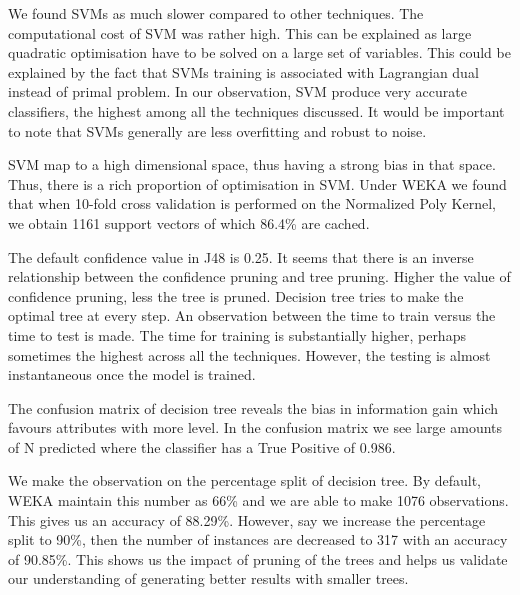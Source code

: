  We found SVMs as much slower compared to other techniques. The computational cost of SVM was rather high. This can be explained as large quadratic optimisation have to be solved on a large set of variables. This could be explained by the fact that SVMs training is associated with Lagrangian dual instead of primal problem. In our observation, SVM produce very accurate classifiers, the highest among all the techniques discussed. It would be important to note that SVMs generally are less overfitting and robust to noise.

SVM map to a high dimensional space, thus having a strong bias in that space. Thus, there is a rich proportion of optimisation in SVM. Under WEKA we found that when 10-fold cross validation is performed on the Normalized Poly Kernel, we obtain 1161 support vectors of which 86.4\% are cached. 

The default confidence value in J48 is 0.25. It seems that there is an inverse relationship between the confidence pruning and tree pruning. Higher the value of confidence pruning, less the tree is pruned. 
Decision tree tries to make the optimal tree at every step. An observation between the time to train versus the time to test is made. The time for training is substantially higher, perhaps sometimes the highest across all the techniques. However, the testing is almost instantaneous once the model is trained. 

The confusion matrix of decision tree reveals the bias in information gain which favours attributes with more level. In the confusion matrix we see large amounts of N predicted where the classifier has a True Positive of 0.986.

We make the observation on the percentage split of decision tree. By default, WEKA maintain this number as 66\% and we are able to make 1076 observations. This gives us an accuracy of 88.29\%. However, say we increase the percentage split to 90\%, then the number of instances are decreased to 317 with an accuracy of 90.85\%. This shows us the impact of pruning of the trees and helps us validate our understanding of generating better results with smaller trees. 






















  
